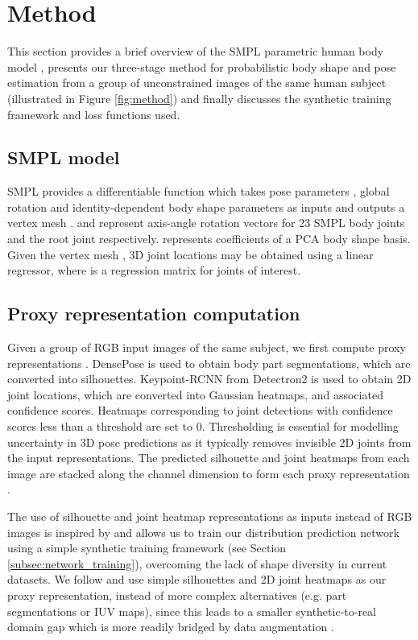 \documentclass[final]{cvpr}
\begin{document}
\section{Method}

This section provides a brief overview of the SMPL parametric human body model  \cite{SMPL:2015}, presents our three-stage method for probabilistic body shape and pose estimation from a group of unconstrained images of the same human subject (illustrated in Figure \ref{fig:method}) and finally discusses the synthetic training framework and loss functions used.

\subsection{SMPL model}

SMPL \cite{SMPL:2015} provides a differentiable function  which takes pose parameters , global rotation  and identity-dependent body shape parameters  as inputs and outputs a vertex mesh .  and  represent axis-angle rotation vectors for 23 SMPL body joints and the root joint respectively.  represents coefficients of a PCA body shape basis. Given the vertex mesh , 3D joint locations may be obtained using a linear regressor,  where  is a regression matrix for  joints of interest.

\subsection{Proxy representation computation}

Given a group of  RGB input images  of the same subject, we first compute proxy representations . DensePose \cite{Guler2018DensePose} is used to obtain body part segmentations, which are converted into silhouettes. Keypoint-RCNN from Detectron2 \cite{he2017maskrcnn, wu2019detectron2} is used to obtain 2D joint locations, which are converted into Gaussian heatmaps, and associated confidence scores. Heatmaps corresponding to joint detections with confidence scores less than a threshold  are set to 0. Thresholding is essential for modelling uncertainty in 3D pose predictions as it typically removes invisible 2D joints from the input representations. The predicted silhouette and joint heatmaps from each image are stacked along the channel dimension to form each proxy representation .

The use of silhouette and joint heatmap representations as inputs instead of RGB images is inspired by \cite{pavlakos2018humanshape, STRAPS2020BMVC} and allows us to train our distribution prediction network using a simple synthetic training framework (see Section \ref{subsec:network_training}), overcoming the lack of shape diversity in current datasets. We follow \cite{STRAPS2020BMVC} and use simple silhouettes and 2D joint heatmaps as our proxy representation, instead of more complex alternatives (e.g. part segmentations or IUV maps), since this leads to a smaller synthetic-to-real domain gap which is more readily bridged by data augmentation \cite{STRAPS2020BMVC}.
\end{document}
